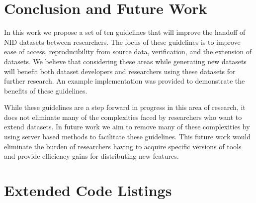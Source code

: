 \documentclass[sigconf]{acmart}
\begin{document}
\section{Conclusion and Future Work}\label{sec:conclusion}
In this work we propose a set of ten guidelines that will improve the handoff of NID datasets between researchers.
The focus of these guidelines is to improve ease of access, reproducibility from source data, verification, and the extension of datasets.
We believe that considering these areas while generating new datasets will benefit both dataset developers and researchers using these datasets for further research.
An example implementation was provided to demonstrate the benefits of these guidelines.

While these guidelines are a step forward in progress in this area of research, it does not eliminate many of the complexities faced by researchers who want to extend datasets.
In future work we aim to remove many of these complexities by using server based methods to facilitate these guidelines.
This future work would eliminate the burden of researchers having to acquire specific versions of tools and provide efficiency gains for distributing new features.




\appendix
\section{Extended Code Listings}
\end{document}
